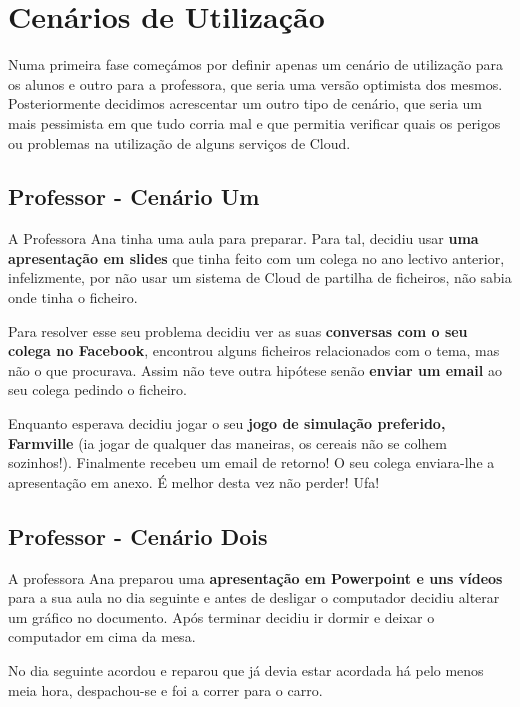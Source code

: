 \chapter{Cenários de Utilização}
\label{chap:usage} 

Numa primeira fase começámos por definir apenas um cenário de utilização para os alunos e outro para a professora, que seria uma versão optimista dos mesmos. Posteriormente decidimos acrescentar um outro tipo de cenário, que seria um mais pessimista em que tudo corria mal e que permitia verificar quais os perigos ou problemas na utilização de alguns serviços de Cloud.

\section{Professor - Cenário Um}

A Professora Ana tinha uma aula para preparar. Para tal, decidiu usar \textbf{uma apresentação em slides} que tinha feito com um colega no ano lectivo anterior, infelizmente, por não usar um sistema de Cloud de partilha de ficheiros, não sabia onde tinha o ficheiro.

Para resolver esse seu problema decidiu ver as suas \textbf{conversas com o seu colega no Facebook}, encontrou alguns ficheiros relacionados com o tema, mas não o que procurava. Assim não teve outra hipótese senão \textbf{enviar um email} ao seu colega pedindo o ficheiro.

Enquanto esperava decidiu jogar o seu \textbf{jogo de simulação preferido, Farmville} (ia jogar de qualquer das maneiras, os cereais não se colhem sozinhos!). Finalmente recebeu um email de retorno! O seu colega enviara-lhe a apresentação em anexo. É melhor desta vez não perder! Ufa!

\section{Professor - Cenário Dois}

A professora Ana preparou uma \textbf{apresentação em Powerpoint e uns vídeos} para a sua aula no dia seguinte e antes de desligar o computador decidiu alterar um gráfico no documento. Após terminar decidiu ir dormir e deixar o computador em cima da mesa.

No dia seguinte acordou e reparou que já devia estar acordada há pelo menos meia hora, despachou-se e foi a correr para o carro.

